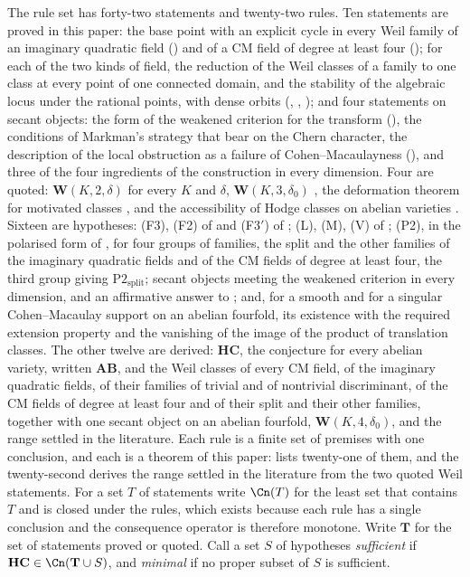 \begin{setupenv}\label{setup:rules}
The rule set has forty-two statements and twenty-two rules. Ten statements
are proved in this paper: the base point with an explicit cycle in every Weil
family of an imaginary quadratic field (\cite[Theorem~15.27]{paperI}) and of a CM
field of degree at least four (\cite[Theorem~17.5]{paperI}); for each of the two
kinds of field, the reduction of the Weil classes of a family to one class at
every point of one connected domain, and the stability of the algebraic locus
under the rational points, with dense orbits (\cite[Section~12]{paperI},
\cite[Proposition~16.7]{paperI}, \cite[Theorem~17.7]{paperI}); and four statements on
secant objects: the form of the weakened criterion for the transform
(), the conditions of Markman's strategy that bear on the
Chern character, the description of the local obstruction as a failure of
Cohen--Macaulayness (), and three of the four
ingredients of the construction in every dimension. Four are quoted:
$\mathbf{W}(K,2,\delta)$ for every $K$ and $\delta$, $\mathbf{W}(K,3,\delta_{0})$
\cite{Mar25a,Mar25b}, the deformation theorem for motivated classes
\cite[Th\'eor\`eme~0.5]{And96b}, and the accessibility of Hodge classes on
abelian varieties \cite[\S5.1, Theorem~3]{Mil20}. Sixteen are hypotheses:
(F3), (F2) of  and (F3$'$) of ;
(L), (M), (V) of ; (P2), in the polarised form of
, for four groups of families, the split and the other
families of the imaginary quadratic fields and of the CM fields of degree at
least four, the third group giving $\mathrm{P2}_{\mathrm{split}}$; secant
objects meeting the weakened criterion in every dimension, and an affirmative
answer to \cite[Question~11.4]{Mar25b}; and, for a smooth and for a singular
Cohen--Macaulay support on an abelian fourfold, its existence with the
required extension property and the vanishing of the image of the product of
translation classes. The other twelve are derived: $\mathbf{HC}$, the
conjecture for every abelian variety, written $\mathbf{AB}$, and the Weil
classes of every CM field, of the imaginary quadratic fields, of their
families of trivial and of nontrivial discriminant, of the CM fields of
degree at least four and of their split and their other families, together
with one secant object on an abelian fourfold, $\mathbf{W}(K,4,\delta_{0})$,
and the range settled in the literature. Each rule is a finite set of
premises with one conclusion, and each is a theorem of this paper:
 lists twenty-one of them, and the twenty-second derives the
range settled in the literature from the two quoted Weil statements. For a
set $T$ of statements write $\Cn(T)$ for the least set that contains $T$ and
is closed under the rules, which exists because each rule has a single
conclusion and the consequence operator is therefore monotone. Write
$\mathbf{T}$ for the set of statements proved or quoted. Call a set $S$ of
hypotheses \emph{sufficient} if $\mathbf{HC}\in\Cn(\mathbf{T}\cup S)$, and
\emph{minimal} if no proper subset of $S$ is sufficient.
\end{setupenv}

